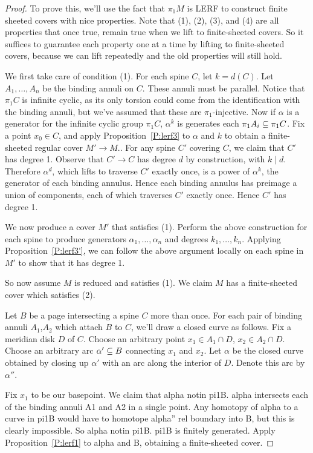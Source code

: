\begin{proof}

To prove this, we'll use the fact that $\pi_1M$ is LERF to construct finite
sheeted covers with nice properties. Note that (1), (2), (3), and (4) are all
properties that once true, remain true when we lift to finite-sheeted covers.
So it suffices to guarantee each property one at a time by lifting to
finite-sheeted covers, because we can lift repeatedly and the old properties
will still hold.

We first take care of condition (1). For each spine $C$, let $k=d(C)$.  Let
$A_1,\dots,A_n$ be the binding annuli on $C$. These annuli must be parallel.
Notice that $\pi_1C$ is infinite cyclic, as its only torsion could come from
the identification with the binding annuli, but we've assumed that these are
$\pi_1$-injective. Now if $\alpha$ is a generator for the infinite cyclic group
$\pi_1C$, $\alpha^k$ is generates each $\pi_1A_i \subseteq \pi_1C$. Fix a point $x_0
\in C$, and apply Proposition~\ref{P:lerf3} to $\alpha$ and $k$ to obtain
a finite-sheeted regular cover $M' \to M$..  For any spine $C'$ covering $C$,
we claim that $C'$ has degree 1. Observe that $C'\to C$ has degree $d$ by
construction, with $k \mid d$. Therefore $\alpha^d$, which lifts to traverse
$C'$ exactly once, is a power of $\alpha^k$, the generator of each binding
annulus. Hence each binding annulus has preimage a union of components, each of
which traverses $C'$ exactly once. Hence $C'$ has degree 1.

We now produce a cover $M'$ that satisfies (1). Perform the above construction
for each spine to produce generators $\alpha_1,\dots,\alpha_n$ and degrees
$k_1,\dots,k_n$. Applying Proposition~\ref{P:lerf3'}, we can follow the above
argument locally on each spine in $M'$ to show that it has degree 1.

So now assume $M$ is reduced and satisfies (1). We claim $M$ has
a finite-sheeted cover which satisfies (2).

Let $B$ be a page intersecting a spine $C$ more than once. For each pair of
binding annuli $A_1$,$A_2$ which attach $B$ to $C$, we'll draw a closed curve
as follows.  Fix a meridian disk $D$ of $C$. Choose an arbitrary point $x_1 \in
A_1 \cap D$, $x_2 \in A_2 \cap D$. Choose an arbitrary arc $\alpha' \subseteq B$
connecting $x_1$ and $x_2$.  Let $\alpha$ be the closed curve obtained by
closing up $\alpha'$ with an arc along the interior of $D$. Denote this arc by
$\alpha''$.

Fix $x_1$ to be our basepoint. We claim that alpha notin pi1B. alpha intersects
each of the binding annuli A1 and A2 in a single point. Any homotopy of alpha
to a curve in pi1B would have to homotope alpha'' rel boundary into B, but this
is clearly impossible. So alpha notin pi1B. pi1B is finitely generated. Apply
Proposition~\ref{P:lerf1} to alpha and B, obtaining a finite-sheeted cover.


\end{proof}
